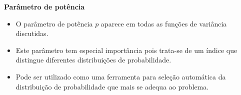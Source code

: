 \documentclass[10pt,
  aspectratio=169,
  serif,
  mathserif,
  professionalfont,
  compress,
  handout,
  ]{beamer}\usepackage[]{graphicx}\usepackage[]{color}
\begin{document}

\begin{frame}[c, allowframebreaks]

\textbf{Parâmetro de potência}

\begin{itemize}
  
  \item O parâmetro de potência $p$ aparece em todas as funções de variância discutidas.
  
  \item Este parâmetro tem especial importância pois trata-se de um índice que distingue diferentes distribuições de probabilidade.
  
  \item Pode ser utilizado como uma ferramenta para seleção automática da distribuição de probabilidade que mais se adequa ao problema.
  
\end{itemize}

\end{frame}

\end{document}
